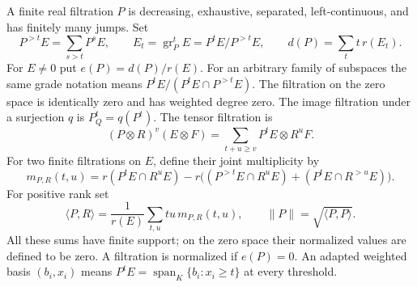 \begin{definition}
\label{def:induction-filtrations}
\leanok
A finite real filtration $P$ is decreasing, exhaustive, separated,
left-continuous, and has finitely many jumps. Set
\[
 P^{>t}E=\sum_{s>t}P^sE,\qquad
 E_t=\operatorname{gr}_P^t E=P^tE/P^{>t}E,
 \qquad d(P)=\sum_t t\,r(E_t).
\]
For $E\ne0$ put $e(P)=d(P)/r(E)$. For an arbitrary family of subspaces
the same grade notation means $P^tE/(P^tE\cap P^{>t}E)$.
The filtration on the zero space is identically zero and has weighted
degree zero. The image filtration under a surjection $q$ is $P_Q^t=q(P^t)$.
The tensor filtration is
\[
 (P\otimes R)^v(E\otimes F)=\sum_{t+u\ge v}P^tE\otimes R^uF.
\]
For two finite filtrations on $E$, define their joint multiplicity by
\[
 m_{P,R}(t,u)=r(P^tE\cap R^uE)
 -r\bigl((P^{>t}E\cap R^uE)+(P^tE\cap R^{>u}E)\bigr).
\]
For positive rank set
\[
 \langle P,R\rangle=\frac1{r(E)}\sum_{t,u}tu\,m_{P,R}(t,u),
 \qquad \|P\|=\sqrt{\langle P,P\rangle}.
\]
All these sums have finite support; on the zero space their normalized
values are defined to be zero. A filtration is normalized if $e(P)=0$.
An adapted weighted basis $(b_i,x_i)$ means
$P^tE=\operatorname{span}_K\{b_i:x_i\ge t\}$ at every threshold.
\end{definition}

